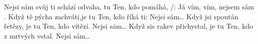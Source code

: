\begin{TEXT}{Nejsi sám svůj}
\SLOKA	{} ti schází odvaha,  tu Ten, kdo pomáhá,\NL
	/:      \NL
	Já vím,  vím, nejsem  sám  \NL
	       . 
\SLOKA	Když tě pýcha zachvátí,je tu Ten, kdo říká ti:\NL
	Nejsi sám…
\SLOKA	Když jsi spoután řetězy, je tu Ten, kdo vítězí.\NL
	Nejsi sám…
\SLOKA	Když sis rakev přichystal, je tu Ten, kdo z mrtvých vstal.\NL
	Nejsi sám…
\end{TEXT}
